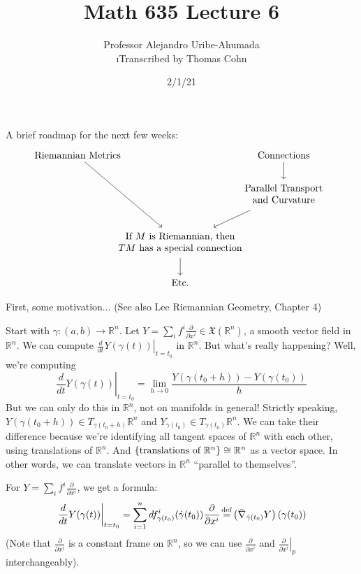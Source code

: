 \documentclass[10pt,letterpaper]{article}
\author{Professor Alejandro Uribe-Ahumada\\ \small\i{Transcribed by Thomas Cohn}}
\title{Math 635 Lecture 6}
\date{2/1/21} %
\newcommand{\n}{\hfill\break}
\newcommand{\ptxt}[1]{\textrm{\textnormal{#1}}}
\newcommand{\set}[1]{\left\{#1\right\}}
\newcommand{\reals}{\mathbb{R}}
\newcommand{\R}{\reals}
\newcommand{\pdat}[3]{\left.\pd{#1}{#2}\right|_{#3}}
\newcommand{\restr}[2]{\left.#1\right|_{#2}}
\newcommand{\pd}[2]{\frac{\partial{}#1}{\partial{}#2}}
\newcommand{\labeledeq}[1]{\overset{\mathclap{\ptxt{#1}}}{=}}
\newcommand{\eqdef}{\labeledeq{def}}
\newcommand{\paren}[1]{\left(#1\right)}
\begin{document}
\maketitle
\setlength\RaggedRightParindent{\parindent}
\RaggedRight

\par\noindent
A brief roadmap for the next few weeks:
\[
	\begin{tikzcd}
		\ptxt{Riemannian Metrics} \arrow[ddr] &[-40pt] &[-40pt] \ptxt{Connections} \arrow[d]\\
		& & \begin{array}{c}
			\ptxt{Parallel Transport}\\
			\ptxt{and Curvature}
		\end{array} \arrow[dl]\\
		& \begin{array}{c}
			\ptxt{If $M$ is Riemannian, then}\\
			\ptxt{$TM$ has a special connection}
		\end{array} \arrow[d]\\
		& \ptxt{Etc.}
	\end{tikzcd}
\]

\par\noindent
First, some motivation... (See also Lee Riemannian Geometry, Chapter 4)\n

\par\noindent
Start with $\gamma:(a,b)\to\R^{n}$. Let $Y=\sum_{i}f^{i}\pd{}{x^{i}}\in\mathfrak{X}(\R^{n})$, a smooth vector field in $\R^{n}$. We can compute $\restr{\frac{d}{dt}Y(\gamma(t))}{t=t_{0}}$ in $\R^{n}$. But what's really happening? Well, we're computing
\[
	\restr{\frac{d}{dt}Y(\gamma(t))}{t=t_{0}}=\lim_{h\to{}0}\frac{Y(\gamma(t_{0}+h))-Y(\gamma(t_{0}))}{h}
\]
But we can only do this in $\R^{n}$, not on manifolds in general! Strictly speaking, $Y(\gamma(t_{0}+h))\in{}T_{\gamma(t_{0}+h)}\R^{n}$ and $Y_{\gamma(t_{0})}\in{}T_{\gamma(t_{0})}\R^{n}$. We can take their difference because we're identifying all tangent spaces of $\R^{n}$ with each other, using translations of $\R^{n}$. And $\set{\ptxt{translations of $\R^{n}$}}\cong\R^{n}$ as a vector space. In other words, we can translate vectors in $\R^{n}$ ``parallel to themselves''.\n

\par\noindent
For $Y=\sum_{i}f^{i}\pd{}{x^{i}}$, we get a formula:
\[
	\restr{\frac{d}{dt}Y(\gamma(t))}{t=t_{0}}=\sum_{i=1}^{n}df_{\gamma(t_{0})}^{i}(\dot\gamma(t_{0}))\pd{}{x^{i}}\eqdef\paren{\bar\nabla_{\dot\gamma(t_{0})}Y}(\gamma(t_{0}))
\]
(Note that $\pd{}{x^{i}}$ is a constant frame on $\R^{n}$, so we can use $\pd{}{x^{i}}$ and $\pdat{}{x^{i}}{p}$ interchangeably).\n
\end{document}
